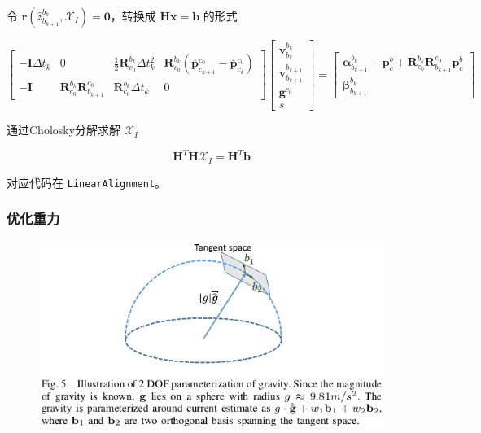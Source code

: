 \documentclass[12pt,a4paper]{article}
\begin{document}
令 $\mathbf{r}(\hat{z}_{b_{k+1}}^{b_{k}}, \mathcal{X}_I)=\mathbf{0}$，转换成 $\mathbf{Hx}=\mathbf{b}$ 的形式

\begin{equation}
\label{equ:init_vgs}
\begin{bmatrix}
-\mathbf{I} \Delta t_{k} & 0 & \frac{1}{2} \mathbf{R}^{b_{k}}_{c_{0}} \Delta t_{k}^{2} &
\mathbf{R}^{b_{k}}_{c_{0}} (\bar{\mathbf{p}}^{c_{0}}_{c_{k+1}} - \bar{\mathbf{p}}^{c_{0}}_{c_{k}}) \\
-\mathbf{I} & \mathbf{R}^{b_{k}}_{c_{0}} \mathbf{R}^{c_0}_{b_{k+1}} & \mathbf{R}^{b_{k}}_{c_{0}}\Delta t_{k} & 0
\end{bmatrix}
\begin{bmatrix}
\mathbf{v}^{b_{k}}_{b_{k}}\\
\mathbf{v}^{b_{k+1}}_{b_{k+1}}\\
\mathbf{g}^{c_{0}}\\
s
\end{bmatrix} 
=
\begin{bmatrix}
\boldsymbol{\alpha}^{b_{k}}_{b_{k+1}} - \mathbf{p}_c^b + \mathbf{R}^{b_{k}}_{c_{0}} \mathbf{R}^{c_0}_{b_{k+1}} \mathbf{p}_c^b \\
\boldsymbol{\beta}^{b_{k}}_{b_{k+1}}
\end{bmatrix}
\end{equation}

通过Cholosky分解求解 $\mathcal{X}_I$

\begin{equation}
\mathbf{H}^T \mathbf{H} \mathcal{X}_I = \mathbf{H}^T \mathbf{b}
\end{equation}

对应代码在 \verb|LinearAlignment|。

\subsubsection{优化重力}

\begin{figure}[htbp]
\centering
\includegraphics[scale=0.6]{images/gravity_tangent_space.png}
\end{figure}
\end{document}
